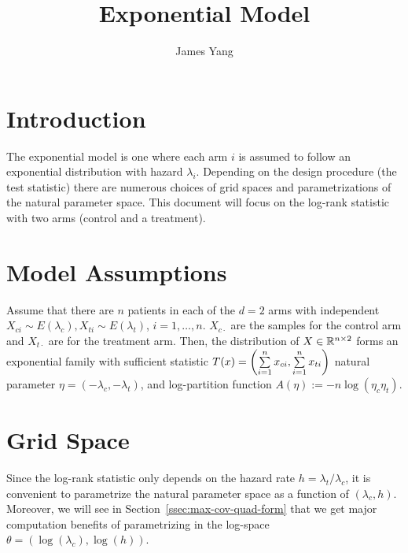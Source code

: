 \documentclass[10pt, a4paper]{article}
\begin{document}
\title{Exponential Model}
\author{James Yang}
\maketitle

\section{Introduction}

The exponential model is one where each arm $i$ is assumed to follow
an exponential distribution with hazard $\lambda_i$.
Depending on the design procedure (the test statistic)
there are numerous choices of grid spaces and parametrizations
of the natural parameter space.
This document will focus on the log-rank statistic with two arms 
(control and a treatment).

\section{Model Assumptions}\label{sec:model}

Assume that there are $n$ patients in each of the $d=2$ arms
with independent $X_{ci} \sim E(\lambda_c), X_{ti} \sim E(\lambda_t)$,
$i=1,\ldots, n$.
$X_{c\cdot}$ are the samples for the control arm and
$X_{t\cdot}$ are for the treatment arm.
Then, the distribution of $X \in \mathbb{R}^{n \times 2}$ forms an exponential family
with sufficient statistic $T(x) = \left(\sum\limits_{i=1}^n x_{ci}, \sum\limits_{i=1}^n x_{ti}\right)$
natural parameter $\eta = (-\lambda_c, -\lambda_t)$,
and log-partition function $A(\eta) := -n\log(\eta_c \eta_t)$.

\section{Grid Space}

Since the log-rank statistic only depends on the hazard rate
$h = \lambda_t / \lambda_c$,
it is convenient to parametrize the natural parameter space
as a function of $(\lambda_c, h)$.
Moreover, we will see in Section~\ref{ssec:max-cov-quad-form}
that we get major computation benefits of parametrizing in the log-space
$\theta = (\log(\lambda_c), \log(h))$.
\end{document}
